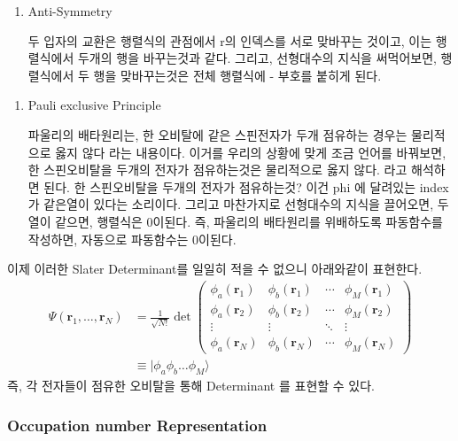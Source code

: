 \documentclass[11pt]{article}
\begin{document}
\begin{enumerate}[label=\(\mathrm{i}\))]
\item {Anti-Symmetry}

두 입자의 교환은 행렬식의 관점에서 r의 인덱스를 서로 맞바꾸는 것이고, 이는 행렬식에서 두개의 행을 바꾸는것과 같다.
그리고, 선형대수의 지식을 써먹어보면, 행렬식에서 두 행을 맞바꾸는것은 전체 행렬식에 - 부호를 붙히게 된다. 
\end{enumerate}

\begin{enumerate}[label=\(\mathrm{ii}\))]
\item {Pauli exclusive Principle}

파울리의 배타원리는, 한 오비탈에 같은 스핀전자가 두개 점유하는 경우는 물리적으로 옳지 않다 라는 내용이다. 
이거를 우리의 상황에 맞게 조금 언어를 바꿔보면, 한 스핀오비탈을 두개의 전자가 점유하는것은 물리적으로 옳지 않다. 라고 해석하면 된다. 
한 스핀오비탈을 두개의 전자가 점유하는것? 이건 phi 에 달려있는 index가 같은열이 있다는 소리이다. 
그리고 마찬가지로 선형대수의 지식을 끌어오면, 두 열이 같으면, 행렬식은 0이된다. 
즉, 파울리의 배타원리를 위배하도록 파동함수를 작성하면, 자동으로 파동함수는 0이된다. 
\end{enumerate}
이제 이러한 Slater Determinant를 일일히 적을 수 없으니 아래와같이 표현한다. 
\begin{align*}
\Psi(\mathbf{r}_1, \dots, \mathbf{r}_N) 
&= \frac{1}{\sqrt{N!}} \det \begin{pmatrix}
\phi_a(\mathbf{r}_1) & \phi_b(\mathbf{r}_1) & \cdots & \phi_M(\mathbf{r}_1) \\
\phi_a(\mathbf{r}_2) & \phi_b(\mathbf{r}_2) & \cdots & \phi_M(\mathbf{r}_2) \\
\vdots & \vdots & \ddots & \vdots \\
\phi_a(\mathbf{r}_N) & \phi_b(\mathbf{r}_N) & \cdots & \phi_M(\mathbf{r}_N) 
\end{pmatrix} \\
& \equiv \vert \phi_a \phi_b \dots \phi_M\rangle
\end{align*}
즉, 각 전자들이 점유한 오비탈을 통해 Determinant 를 표현할 수 있다. 



\subsubsection{Occupation number Representation}
\end{document}
